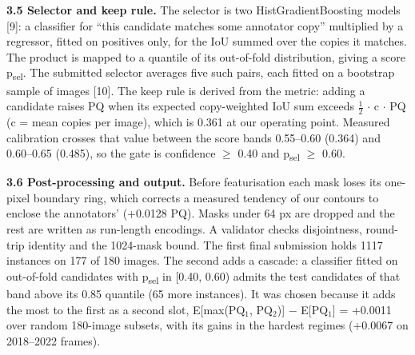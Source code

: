 \textbf{3.5 Selector and keep rule.} The selector is two HistGradientBoosting models {[}9{]}: a classifier
for ``this candidate matches some annotator copy'' multiplied by a regressor, fitted on positives
only, for the IoU summed over the copies it matches. The product is mapped to a quantile of its
out-of-fold distribution, giving a score p\textsubscript{sel}. The submitted selector averages five such pairs,
each fitted on a bootstrap sample of images {[}10{]}. The keep rule is derived from the metric: adding
a candidate raises PQ when its expected copy-weighted IoU sum exceeds $\tfrac12$ $\cdot$ c $\cdot$ PQ (c = mean copies
per image), which is 0.361 at our operating point. Measured calibration crosses that value between
the score bands 0.55--0.60 (0.364) and 0.60--0.65 (0.485), so the gate is confidence $\geq$ 0.40 and
p\textsubscript{sel} $\geq$ 0.60.

\textbf{3.6 Post-processing and output.} Before featurisation each mask loses its one-pixel boundary
ring, which corrects a measured tendency of our contours to enclose the annotators' (+0.0128 PQ).
Masks under 64 px are dropped and the rest are written as run-length encodings. A validator checks
disjointness, round-trip identity and the 1024-mask bound. The first final submission holds 1117
instances on 177 of 180 images. The second adds a cascade: a classifier fitted on out-of-fold
candidates with p\textsubscript{sel} in {[}0.40, 0.60) admits the test candidates of that band above its 0.85
quantile (65 more instances). It was chosen because it adds the most to the first as a second
slot, E{[}max(PQ$_1$, PQ$_2$){]} $-$ E{[}PQ$_1${]} = +0.0011 over random 180-image subsets, with its gains in the
hardest regimes (+0.0067 on 2018--2022 frames).

